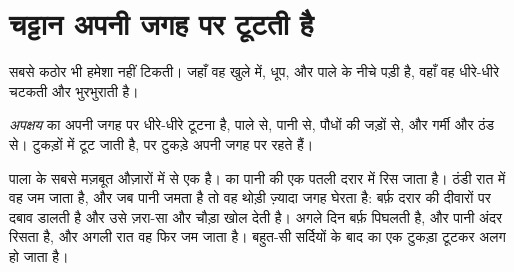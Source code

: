 \section{चट्टान अपनी जगह पर टूटती है}

सबसे कठोर  भी हमेशा नहीं टिकती। जहाँ वह खुले में, धूप,  और पाले के
नीचे पड़ी है, वहाँ वह धीरे-धीरे चटकती और भुरभुराती है।

\begin{definition}[अपक्षय]\label{def:g5:water-shapes-the-land:weathering}
\emph{अपक्षय}  का अपनी जगह पर धीरे-धीरे टूटना है, पाले से,
पानी से, पौधों की जड़ों से, और गर्मी और ठंड से।  टुकड़ों में टूट जाती है,
पर टुकड़े अपनी जगह पर रहते हैं।
\end{definition}

पाला  के सबसे मज़बूत औज़ारों में से एक है।  का पानी  की एक पतली
दरार में रिस जाता है। ठंडी रात में वह जम जाता है, और जब पानी जमता है तो वह
थोड़ी ज़्यादा जगह घेरता है: बर्फ़ दरार की दीवारों पर दबाव डालती है और उसे ज़रा-सा
और चौड़ा खोल देती है। अगले दिन बर्फ़ पिघलती है, और पानी अंदर रिसता है, और अगली
रात वह फिर जम जाता है। बहुत-सी सर्दियों के बाद  का एक टुकड़ा टूटकर अलग हो
जाता है।

